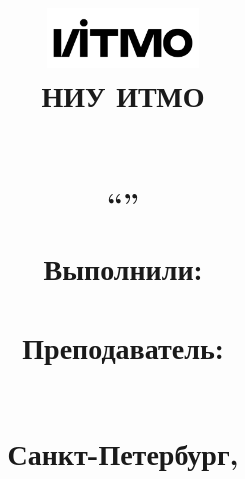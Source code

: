 \begin{titlepage}

\thispagestyle{empty}

\title{
    \includegraphics[width=4cm]{media/logo.png} \\
    \vspace{1em}
    НИУ ИТМО 
    \vspace{4em}

    \begin{center}
        \large \textsc{\textbf{\name}}
        \\ \vspace{1em}
        ``\subname''  %
    \end{center}

    \vspace*{\fill}

    \begin{flushright}
        {\normalsize 
            Выполнили: \\ \textbf{\madeby} \\
            \vspace{1em}
            Преподаватель: \\ \textbf{\teacher} \\
        }
    \end{flushright}	

    \vspace{2em}

    \begin{center}
        \small{Санкт-Петербург, \the\year}
    \end{center}
}

\author{}
\date{}
\maketitle
\thispagestyle{empty}
\end{titlepage}